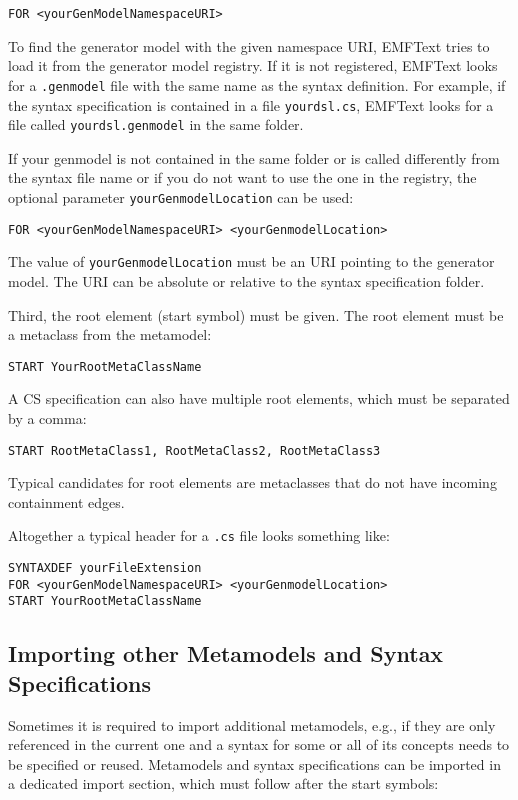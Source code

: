 \begin{lstlisting}
FOR <yourGenModelNamespaceURI>
\end{lstlisting}

To find the generator model with the given namespace URI, EMFText tries to 
load it from the generator model registry. If it is not registered, EMFText 
looks for a \texttt{.genmodel} file with the same name as the syntax 
definition. For example, if the syntax 
specification is contained in a file \texttt{yourdsl.cs}, EMFText looks for a
file called \texttt{yourdsl.genmodel} in the same folder.

If your genmodel is not contained in the same folder or is called differently
from the syntax file name or if you do not want to use the one in the registry, 
the optional parameter \texttt{yourGenmodelLocation} can be used: 

\begin{lstlisting}
FOR <yourGenModelNamespaceURI> <yourGenmodelLocation>
\end{lstlisting}

The value of \texttt{yourGenmodelLocation} must be an URI pointing to the 
generator model. The URI can be absolute or relative to the syntax 
specification folder.
 
Third, the root element (start symbol) must be given. The root element must be
a metaclass from the metamodel:

\begin{lstlisting}
START YourRootMetaClassName
\end{lstlisting}

A CS specification can also have multiple root elements, which must be separated
by a comma:

\begin{lstlisting}
START RootMetaClass1, RootMetaClass2, RootMetaClass3
\end{lstlisting}

Typical candidates for root elements are metaclasses that do not have incoming 
containment edges. 

Altogether a typical header for a \texttt{.cs} file looks something like:

\begin{lstlisting}
SYNTAXDEF yourFileExtension
FOR <yourGenModelNamespaceURI> <yourGenmodelLocation>
START YourRootMetaClassName
\end{lstlisting} 

\subsection{Importing other Metamodels and Syntax Specifications}
Sometimes it is required to import additional metamodels, e.g., if they are only
referenced in the current one and a syntax for some or all of its concepts
needs to be specified or reused. 
Metamodels and syntax specifications can be 
imported in a dedicated import section, which must follow after the start symbols:

